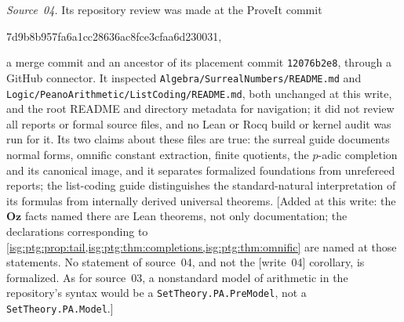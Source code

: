 \documentclass[11pt]{article}
\theoremstyle{definition}
\theoremstyle{remark}
\newcommand{\Oz}{\ensuremath{\mathbf{Oz}}}
\newcommand{\fn}[1]{\nolinkurl{#1}}
\begin{document}
\emph{Source~04.}\label{isg:ptg:sec:relationLean} Its repository review was
made at the ProveIt commit
\begin{center}\small\ttfamily
7d9b8b957fa6a1cc28636ac8fce3cfaa6d230031,
\end{center}
a merge commit and an ancestor of its placement commit \texttt{12076b2e8},
through a GitHub connector. It inspected
\fn{Algebra/SurrealNumbers/README.md} and
\fn{Logic/PeanoArithmetic/ListCoding/README.md}, both unchanged at this
write, and the root README and directory metadata for navigation; it did
not review all reports or formal source files, and no Lean or Rocq build or
kernel audit was run for it. Its two claims about these files are true: the
surreal guide documents normal forms, omnific constant extraction, finite
quotients, the $p$-adic completion and its canonical image, and it
separates formalized foundations from unrefereed reports; the list-coding
guide distinguishes the standard-natural interpretation of its formulas from
internally derived universal theorems. \textup{[}Added at this write: the
$\Oz$ facts named there are Lean theorems, not only documentation; the
declarations corresponding to \cref{isg:ptg:prop:tail,isg:ptg:thm:completions,isg:ptg:thm:omnific}
are named at those statements. No statement of source~04, and not the
\textup{[write~04]} corollary, is formalized. As for source~03, a
nonstandard model of arithmetic in the repository's syntax would be a
\fn{SetTheory.PA.PreModel}, not a \fn{SetTheory.PA.Model}.\textup{]}
\end{document}
